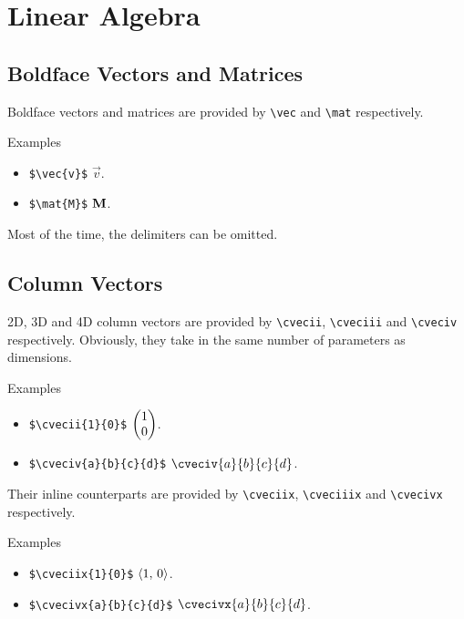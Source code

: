 \section{Linear Algebra}

\subsection{Boldface Vectors and Matrices}

Boldface vectors and matrices are provided by \verb|\vec| and \verb|\mat| respectively.

\begin{myframe}{Examples}
    \begin{itemize}
        \item \verb|$\vec{v}$| \produces{} $\vec{v}$.
        \item \verb|$\mat{M}$| \produces{} $\mathbf{M}$.
    \end{itemize}
\end{myframe}

Most of the time, the delimiters can be omitted.

\subsection{Column Vectors}

2D, 3D and 4D column vectors are provided by \verb|\cvecii|, \verb|\cveciii| and \verb|\cveciv| respectively. Obviously, they take in the same number of parameters as dimensions.

\begin{myframe}{Examples}
    \begin{itemize}
        \item \verb|$\cvecii{1}{0}$| \produces{} $\displaystyle\begin{pmatrix} 1 \\ 0 \end{pmatrix}$.
        \item \verb|$\cveciv{a}{b}{c}{d}$| \produces{} $\displaystyle\cveciv{a}{b}{c}{d}$.
    \end{itemize}
\end{myframe}

Their inline counterparts are provided by \verb|\cveciix|, \verb|\cveciiix| and \verb|\cvecivx| respectively.

\begin{myframe}{Examples}
    \begin{itemize}
        \item \verb|$\cveciix{1}{0}$| \produces{} $\left\langle 1, \, 0 \right\rangle$.
        \item \verb|$\cvecivx{a}{b}{c}{d}$| \produces{} $\cvecivx{a}{b}{c}{d}$.
    \end{itemize}
\end{myframe}

